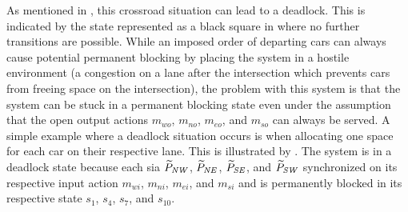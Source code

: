 As mentioned in \Sect{\ref{sect_background_comp}}, this crossroad situation can lead to a deadlock.
This is indicated by the state represented as a black square in \Fig{\ref{fig_cross_sia_dl}} where no further transitions are possible.
While an imposed order of departing cars can always cause potential permanent blocking by placing the system in a hostile environment (\eg a congestion on a lane after the intersection which prevents cars from freeing space on the intersection), the problem with this system is that the system can be stuck in a permanent blocking state even under the assumption that the open output actions $m_{wo}$, $m_{no}$, $m_{eo}$, and $m_{so}$ can always be served.
A simple example where a deadlock situation occurs is when allocating one space for each car on their respective lane.
This is illustrated by \Fig{\ref{fig_cross_sync_b}}.
The system is in a deadlock state because each \gls{sia} $\widetilde{P}_{\mathit{NW}}$, $\widetilde{P}_{\mathit{NE}}$, $\widetilde{P}_{\mathit{SE}}$, and $\widetilde{P}_{\mathit{SW}}$ synchronized on its respective input action $m_{wi}$, $m_{ni}$, $m_{ei}$, and $m_{si}$ and is permanently blocked in its respective state $s_1$, $s_4$, $s_7$, and $s_{10}$.

